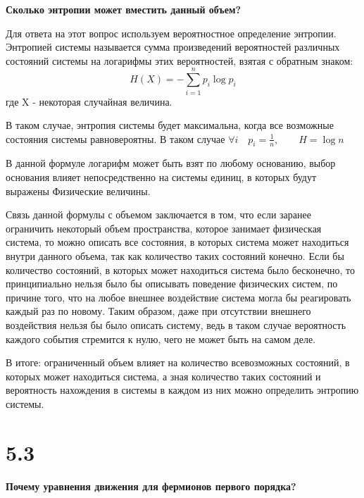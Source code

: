 \documentclass[a4paper,14pt]{article}
\begin{document}
\begin{center}
	\LARGE{\textbf{Сколько энтропии может вместить данный объем?}}\\
\end{center}

Для ответа на этот вопрос используем вероятностное определение энтропии. Энтропией системы называется сумма произведений вероятностей различных состояний системы на логарифмы этих вероятностей, взятая с обратным знаком: 
$$ H(X) = -\sum_{i=1}^n p_i\log p_{i}$$где X - некоторая случайная величина.

В таком случае, энтропия системы будет максимальна, когда все возможные состояния системы равновероятны. В таком случае $\forall i \quad p_{i} = \frac{1}{n},\qquad H = \log n$

В данной формуле логарифм может быть взят по любому основанию, выбор основания влияет непосредственно на системы единиц, в которых будут выражены Физические величины. 

Связь данной формулы с объемом заключается в том, что если заранее ограничить некоторый объем пространства, которое занимает физическая система, то можно описать все состояния, в которых система может находиться внутри данного объема, так как количество таких состояний конечно. Если бы количество состояний, в которых может находиться система было бесконечно, то принципиально нельзя было бы описывать поведение физических систем, по причине того, что на любое внешнее воздействие система могла бы реагировать каждый раз по новому. Таким образом, даже при отсутствии внешнего воздействия нельзя бы было описать систему, ведь в таком случае вероятность каждого события стремится к нулю, чего не может быть на самом деле.

В итоге: ограниченный объем влияет на количество всевозможных состояний, в которых может находиться система, а зная количество таких состояний и вероятность нахождения в системы в каждом из них можно определить энтропию системы.

\section*{5.3}

\begin{center}
	\LARGE{\textbf{Почему уравнения движения для фермионов первого порядка?}}\\
\end{center}
\end{document}

